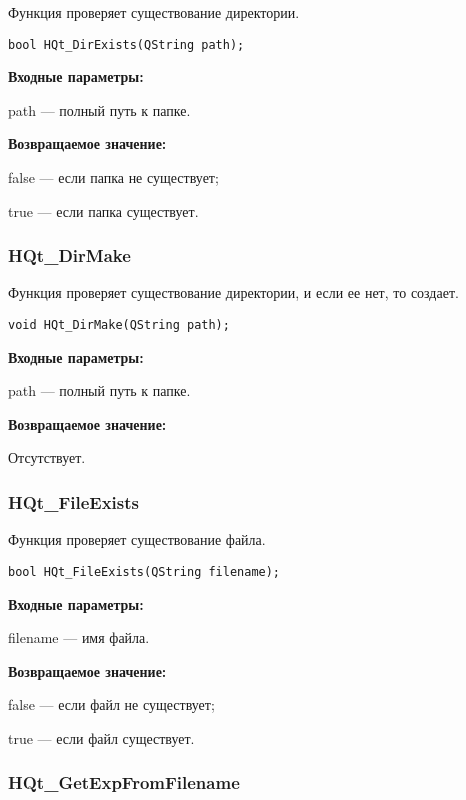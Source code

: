 \documentclass[a4paper,12pt]{article}
\begin{document}
Функция проверяет существование директории.


\begin{lstlisting}[label=code_syntax_HQt_DirExists,caption=Синтаксис]
bool HQt_DirExists(QString path);
\end{lstlisting}

\textbf{Входные параметры:}

path --- полный путь к папке.

\textbf{Возвращаемое значение:}

false --- если папка не существует;

true --- если папка существует.


\subsubsection{HQt\_DirMake}\label{HQt_DirMake}

Функция проверяет существование директории, и если ее нет, то создает.


\begin{lstlisting}[label=code_syntax_HQt_DirMake,caption=Синтаксис]
void HQt_DirMake(QString path);
\end{lstlisting}

\textbf{Входные параметры:}

path --- полный путь к папке.

\textbf{Возвращаемое значение:}

Отсутствует.


\subsubsection{HQt\_FileExists}\label{HQt_FileExists}

Функция проверяет существование файла.


\begin{lstlisting}[label=code_syntax_HQt_FileExists,caption=Синтаксис]
bool HQt_FileExists(QString filename);
\end{lstlisting}

\textbf{Входные параметры:}

filename --- имя файла.

\textbf{Возвращаемое значение:}

false --- если файл не существует;

true --- если файл существует.


\subsubsection{HQt\_GetExpFromFilename}\label{HQt_GetExpFromFilename}
\end{document}
